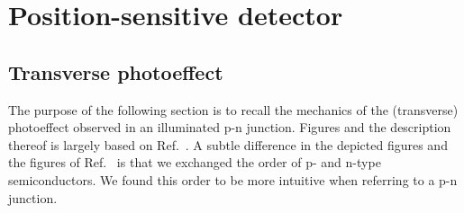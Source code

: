 \section{Position-sensitive detector}

\subsection{Transverse photoeffect}


The purpose of the following section is to recall the mechanics of the (transverse) photoeffect observed in an illuminated p-n junction.
Figures and the description thereof is largely based on Ref.~\cite{Simon13}.
A subtle difference in the depicted figures and the figures of Ref.~\cite{Simon13} is that we exchanged the order of p- and n-type semiconductors.
We found this order to be more intuitive when referring to a p-n junction.

